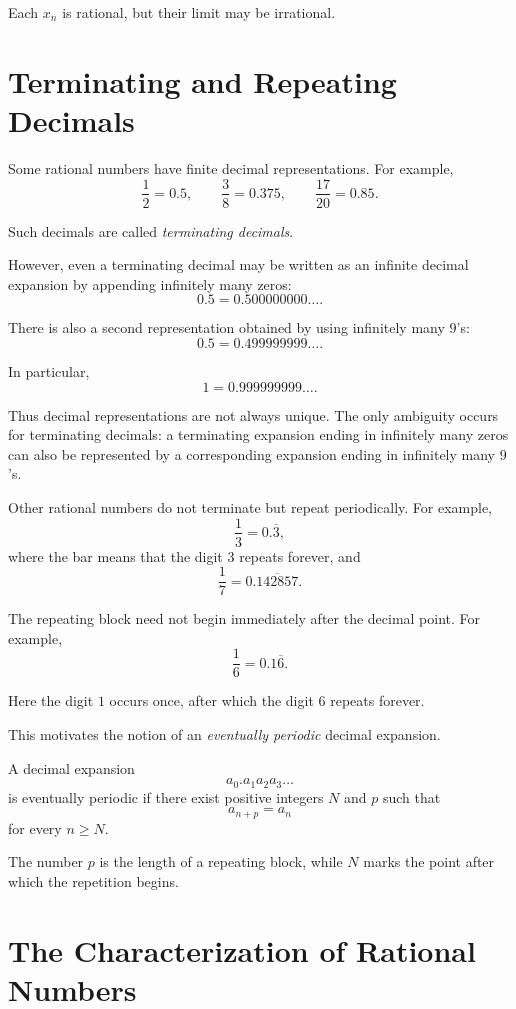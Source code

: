 \documentclass{essay}
\begin{document}
Each \(x_n\) is rational, but their limit may be irrational.

\section{Terminating and Repeating Decimals}

Some rational numbers have finite decimal representations. For example,
\[
\frac{1}{2}=0.5,
\qquad
\frac{3}{8}=0.375,
\qquad
\frac{17}{20}=0.85.
\]

Such decimals are called \emph{terminating decimals}.

However, even a terminating decimal may be written as an infinite decimal expansion by appending infinitely many zeros:
\[
0.5
=
0.500000000\ldots.
\]

There is also a second representation obtained by using infinitely many \(9\)'s:
\[
0.5
=
0.499999999\ldots.
\]

In particular,
\[
1
=
0.999999999\ldots.
\]

Thus decimal representations are not always unique. The only ambiguity occurs for terminating decimals: a terminating expansion ending in infinitely many zeros can also be represented by a corresponding expansion ending in infinitely many \(9\)'s.

Other rational numbers do not terminate but repeat periodically. For example,
\[
\frac{1}{3}
=
0.\overline{3},
\]
where the bar means that the digit \(3\) repeats forever, and
\[
\frac{1}{7}
=
0.\overline{142857}.
\]

The repeating block need not begin immediately after the decimal point. For example,
\[
\frac{1}{6}
=
0.1\overline{6}.
\]

Here the digit \(1\) occurs once, after which the digit \(6\) repeats forever.

This motivates the notion of an \emph{eventually periodic} decimal expansion.

A decimal expansion
\[
a_0.a_1a_2a_3\ldots
\]
is eventually periodic if there exist positive integers \(N\) and \(p\) such that
\[
a_{n+p}=a_n
\]
for every \(n\geq N\).

The number \(p\) is the length of a repeating block, while \(N\) marks the point after which the repetition begins.

\section{The Characterization of Rational Numbers}
\end{document}
